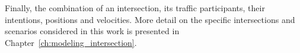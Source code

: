 Finally, the combination of an intersection, its traffic participants, their intentions, positions and velocities. 
More detail on the specific intersections and scenarios considered in this work is presented in Chapter~\ref{ch:modeling_intersection}.





			



